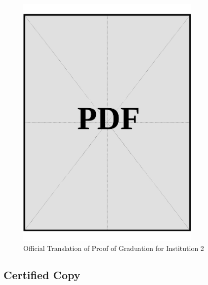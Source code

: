 \begin{figure}[h]
    \centering
    \includegraphics[page=1, width=0.8\textwidth]{../docs/applicant/post-secondary-institutions/institution-2/proof-of-graduation/official-translations.pdf}
    \caption{Official Translation of Proof of Graduation for Institution 2}
    \label{fig:institution-2-proof-of-graduation-official-translation}
\end{figure}

\vspace*{\fill}
\clearpage

\subsection*{Certified Copy}
\vspace*{\fill}

